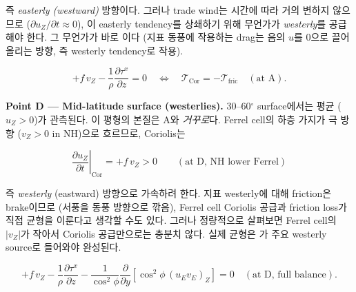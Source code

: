 \noindent
즉 \emph{easterly (westward)} 방향이다.  그러나 trade wind는 시간에 따라 거의
변하지 않으므로 ($\partial u_Z/\partial t \approx 0$), 이 easterly tendency를
상쇄하기 위해 무언가가 \emph{westerly}를 공급해야 한다.  그 무언가가 바로
이다 (지표 동풍에 작용하는 drag는 음의 $u$를
0으로 끌어올리는 방향, 즉 westerly tendency로 작용).

\begin{equation}\label{eq:ch07_temp_pointA_bal}
  \boxed{
    +f\,v_Z - \frac{1}{\rho}\frac{\partial \tau^x}{\partial z} = 0
    \quad\Leftrightarrow\quad
    \mathcal{T}_{\text{Cor}} = -\mathcal{T}_{\text{fric}}
    \quad(\text{at A}).
  }
\end{equation}



\medskip



\noindent\textbf{Point D --- Mid-latitude surface (westerlies).}
30--60$^\circ$ surface에서는 평균  ($u_Z > 0$)가 관측된다.
이 평형의 본질은 A와 \emph{거꾸로}다.  Ferrel cell의 하층 가지가 극 방향
($v_Z > 0$ in NH)으로 흐르므로, Coriolis는

\begin{equation}\label{eq:ch07_temp_pointD}
  \left.\frac{\partial u_Z}{\partial t}\right|_{\text{Cor}}
    = +f\,v_Z > 0 \qquad (\text{at D, NH lower Ferrel})
\end{equation}

\noindent
즉 \emph{westerly} (eastward) 방향으로 가속하려 한다.  지표 westerly에 대해
friction은 brake이므로 (서풍을 동풍 방향으로 깎음), Ferrel cell Coriolis
공급과 friction loss가 직접 균형을 이룬다고 생각할 수도 있다.  그러나
정량적으로 살펴보면 Ferrel cell의 $|v_Z|$가 작아서 Coriolis 공급만으로는
충분치 않다.  실제 균형은 가
주요 westerly source로 들어와야 완성된다.

\begin{equation}\label{eq:ch07_temp_pointD_bal}
  \boxed{
    +f\,v_Z - \frac{1}{\rho}\frac{\partial \tau^x}{\partial z}
    - \frac{1}{\cos^2\phi}\frac{\partial}{\partial y}
      \left[\cos^2\phi\,(u_E v_E)_Z\right] = 0
    \quad(\text{at D, full balance}).
  }
\end{equation}

